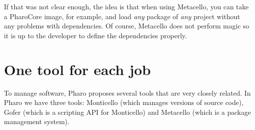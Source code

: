 \documentclass[a4paper,10pt,twoside]{book}
\begin{document}
If that was not clear enough, the idea is that when using Metacello, you can take a PharoCore image, for example, and load {\em any} package of {\em any} project without any problems with dependencies. Of course, Metacello does not perform magic so it is up to the developer to define the dependencies properly.


\section{One tool for each job}

To manage software, Pharo proposes several tools that are very closely related. In Pharo we have three tools: Monticello (which manages versions of source code), Gofer (which is a scripting API for Monticello) and Metacello (which is a package management system).


\end{document}
